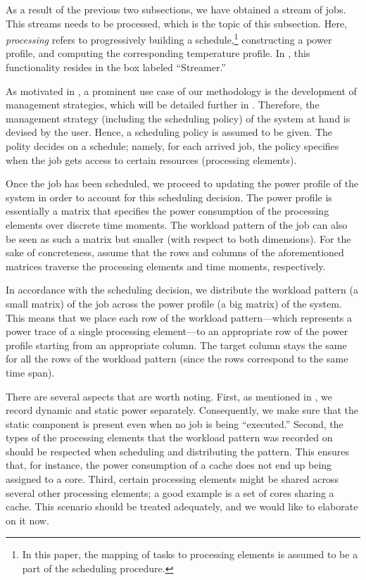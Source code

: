 As a result of the previous two subsections, we have obtained a stream of jobs.
This streams needs to be processed, which is the topic of this subsection. Here,
\emph{processing} refers to progressively building a schedule,\footnote{In this
paper, the mapping of tasks to processing elements is assumed to be a part of
the scheduling procedure.} constructing a power profile, and computing the
corresponding temperature profile. In , this functionality
resides in the box labeled ``Streamer.''

As motivated in , a prominent use case of our methodology is
the development of management strategies, which will be detailed further in
. Therefore, the management strategy (including the
scheduling policy) of the system at hand is devised by the user. Hence, a
scheduling policy is assumed to be given. The polity decides on a schedule;
namely, for each arrived job, the policy specifies when the job gets access to
certain resources (processing elements).

Once the job has been scheduled, we proceed to updating the power profile of the
system in order to account for this scheduling decision. The power profile is
essentially a matrix that specifies the power consumption of the processing
elements over discrete time moments. The workload pattern of the job can also be
seen as such a matrix but smaller (with respect to both dimensions). For the
sake of concreteness, assume that the rows and columns of the aforementioned
matrices traverse the processing elements and time moments, respectively.

In accordance with the scheduling decision, we distribute the workload pattern
(a small matrix) of the job across the power profile (a big matrix) of the
system. This means that we place each row of the workload pattern---which
represents a power trace of a single processing element---to an appropriate row
of the power profile starting from an appropriate column. The target column
stays the same for all the rows of the workload pattern (since the rows
correspond to the same time span).

There are several aspects that are worth noting. First, as mentioned in
, we record dynamic and static power separately. Consequently, we
make sure that the static component is present even when no job is being
``executed.'' Second, the types of the processing elements that the workload
pattern was recorded on should be respected when scheduling and distributing the
pattern. This ensures that, for instance, the power consumption of a cache does
not end up being assigned to a core. Third, certain processing elements might be
shared across several other processing elements; a good example is a set of
cores sharing a cache. This scenario should be treated adequately, and we would
like to elaborate on it now.

